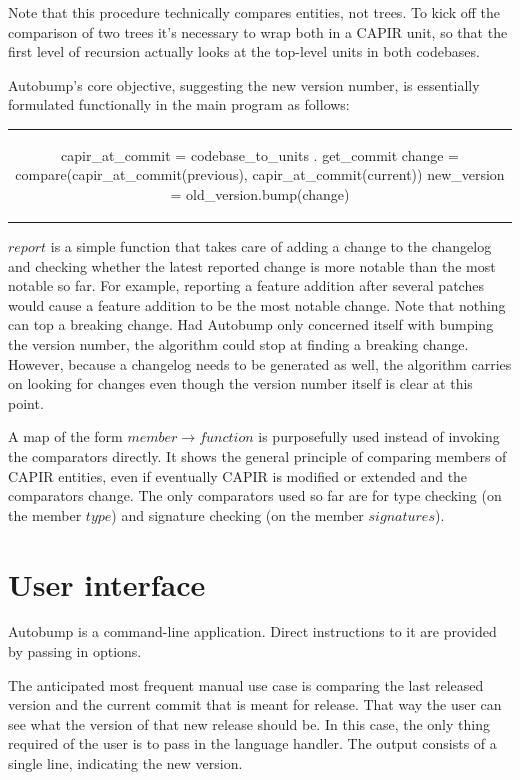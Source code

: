 \documentclass{l4proj}
\begin{document}
Note that this procedure technically compares entities, not trees. To
kick off the comparison of two trees it's necessary to wrap both in a
CAPIR unit, so that the first level of recursion actually looks at the
top-level units in both codebases.

Autobump's core objective, suggesting the new version number, is
essentially formulated functionally in the main program as follows:

\begin{center}
\begin{tabular}{c}
\begin{python}
capir_at_commit = codebase_to_units . get_commit
change = compare(capir_at_commit(previous), capir_at_commit(current))
new_version = old_version.bump(change)
\end{python}
\end{tabular}
\end{center}

$report$ is a simple function that takes care of adding a change to
the changelog and checking whether the latest reported change is more
notable than the most notable so far. For example, reporting a feature
addition after several patches would cause a feature addition to be
the most notable change. Note that nothing can top a breaking change.
Had Autobump only concerned itself with bumping the version number,
the algorithm could stop at finding a breaking change. However,
because a changelog needs to be generated as well, the algorithm
carries on looking for changes even though the version number itself
is clear at this point.

A map of the form $member \rightarrow function$ is purposefully used
instead of invoking the comparators directly. It shows the general
principle of comparing members of CAPIR entities, even if eventually
CAPIR is modified or extended and the comparators change. The only
comparators used so far are for type checking (on the member $type$)
and signature checking (on the member $signatures$).


\section{User interface}

Autobump is a command-line application. Direct instructions to it are
provided by passing in options.

The anticipated most frequent manual use case is comparing the last
released version and the current commit that is meant for release.
That way the user can see what the version of that new release should
be. In this case, the only thing required of the user is to pass in
the language handler. The output consists of a single line, indicating
the new version.
\end{document}
